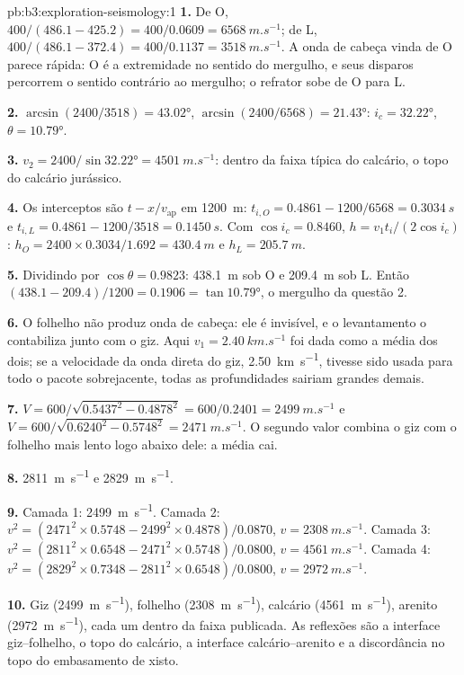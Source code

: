 \begin{solution}{pb:b3:exploration-seismology:1}
\textbf{1.} De O, $400/(486.1 - 425.2) = 400/0.0609 = \qty{6568}{m.s^{-1}}$;
de L, $400/(486.1 - 372.4) = 400/0.1137 = \qty{3518}{m.s^{-1}}$. A onda de
cabeça vinda de O parece rápida: O é a extremidade no sentido do mergulho, e seus disparos percorrem o sentido contrário ao mergulho; o
refrator sobe de O para L.

\textbf{2.} $\arcsin(2400/3518) = \ang{43.02}$, $\arcsin(2400/6568) =
\ang{21.43}$: $i_c = \ang{32.22}$, $\theta = \ang{10.79}$.

\textbf{3.} $v_2 = 2400/\sin\ang{32.22} = \qty{4501}{m.s^{-1}}$: dentro da
faixa típica do calcário, o topo do calcário jurássico.

\textbf{4.} Os interceptos são $t - x/v_{\text{ap}}$ em \qty{1200}{m}:
$t_{i,O} = 0.4861 - 1200/6568 = \qty{0.3034}{s}$ e $t_{i,L} = 0.4861 -
1200/3518 = \qty{0.1450}{s}$. Com $\cos i_c = 0.8460$, $h = v_1t_i/(2\cos
i_c)$: $h_O = 2400\times0.3034/1.692 = \qty{430.4}{m}$ e $h_L =
\qty{205.7}{m}$.

\textbf{5.} Dividindo por $\cos\theta = 0.9823$: \qty{438.1}{m} sob O e
\qty{209.4}{m} sob L. Então $(438.1 - 209.4)/1200 = 0.1906 =
\tan\ang{10.79}$, o mergulho da questão 2.

\textbf{6.} O folhelho não produz onda de cabeça: ele é invisível, e o levantamento
o contabiliza junto com o giz. Aqui $v_1 = \qty{2.40}{km.s^{-1}}$ foi dada como a
média dos dois; se a velocidade da onda direta do giz, \qty{2.50}{km.s^{-1}},
tivesse sido usada para todo o pacote sobrejacente, todas as profundidades sairiam grandes demais.

\textbf{7.} $V = 600/\sqrt{0.5437^2 - 0.4878^2} = 600/0.2401 =
\qty{2499}{m.s^{-1}}$ e $V = 600/\sqrt{0.6240^2 - 0.5748^2} =
\qty{2471}{m.s^{-1}}$. O segundo valor combina o giz com o folhelho mais lento
logo abaixo dele: a média cai.

\textbf{8.} \qty{2811}{m.s^{-1}} e \qty{2829}{m.s^{-1}}.

\textbf{9.} Camada 1: \qty{2499}{m.s^{-1}}. Camada 2: $v^2 = (2471^2\times0.5748
- 2499^2\times0.4878)/0.0870$, $v = \qty{2308}{m.s^{-1}}$. Camada 3:
$v^2 = (2811^2\times0.6548 - 2471^2\times0.5748)/0.0800$,
$v = \qty{4561}{m.s^{-1}}$. Camada 4: $v^2 = (2829^2\times0.7348 -
2811^2\times0.6548)/0.0800$, $v = \qty{2972}{m.s^{-1}}$.

\textbf{10.} Giz (\qty{2499}{m.s^{-1}}), folhelho (\qty{2308}{m.s^{-1}}),
calcário (\qty{4561}{m.s^{-1}}), arenito (\qty{2972}{m.s^{-1}}), cada um dentro
da faixa publicada. As reflexões são a interface giz--folhelho, o topo
do calcário, a interface calcário--arenito e a discordância no
topo do embasamento de xisto.


\end{solution}
